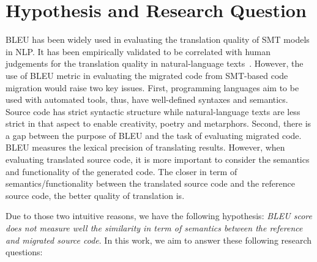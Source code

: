 \section{Hypothesis and Research Question}

BLEU has been widely used in evaluating the translation quality of SMT
models in NLP. It has been empirically validated to be correlated with
human judgements for the translation quality in natural-language
texts~\cite{Papineni2002}.
%
%
However, the use of BLEU metric in evaluating the migrated code from
SMT-based code migration would raise two key issues. First,
programming languages aim to be used with automated tools, thus, have
well-defined syntaxes and semantics. Source code has strict syntactic
structure while natural-language texts are less strict in that aspect
to enable creativity, poetry and metarphors.
%
%
Second, there is a gap between the purpose of BLEU and the task of
evaluating migrated code. BLEU measures the lexical precision of
translating results. However, when evaluating translated source code,
it is more important to consider the semantics and functionality of
the generated code.
%
The closer in term of semantics/functionality between the translated
source code and the reference source code, the better quality of
translation is.
%

Due to those two intuitive reasons, we have the following hypothesis:
{\em BLEU score does not measure well the similarity in term of
  semantics between the reference and migrated source code}. In this
work, we aim to answer these following research questions:

